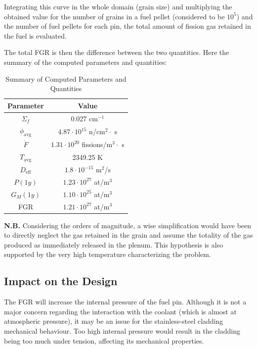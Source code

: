 Integrating this curve in the whole domain (grain size) and multiplying the obtained value for the number of grains in a fuel pellet (considered to be $10^5$) and the number of fuel pellets for each pin, the total amount of fission gas retained in the fuel is evaluated.

The total FGR is then the difference between the two quantities. Here the summary of the computed parameters and quantities:

\begin{table}[h!]
    \centering
    \caption{Summary of Computed Parameters and Quantities}
    \begin{tabular}{|c|c|}
        \hline
        \textbf{Parameter} & \textbf{Value} \\
        \hline
        $\Sigma_f$ & 0.027 cm$^{-1}$ \\
        $\phi_{\text{avg}}$ & $4.87 \cdot 10^{15}$ n/cm$^2 \cdot$ s \\
        $\dot{F}$ & $1.31 \cdot 10^{20}$ fissions/m$^3 \cdot$ s \\
        $T_{\text{avg}}$ & 2349.25 K \\
        $D_{\text{eff}}$ & $1.8 \cdot 10^{-15}$ m$^2$/s \\
        $P(1y)$ & $1.23 \cdot 10^{27}$ at/m$^3$ \\
        $G_M(1y)$ & $1.10 \cdot 10^{25}$ at/m$^3$ \\
        FGR & $1.21 \cdot 10^{27}$ at/m$^3$ \\
        \hline
    \end{tabular}
    \label{tab:fgr_summary}
\end{table}

\noindent \textbf{N.B.} Considering the orders of magnitude, a wise simplification would have been to directly neglect the gas retained in the grain and assume the totality of the gas produced as immediately released in the plenum. This hypothesis is also supported by the very high temperature characterizing the problem.

\subsection{Impact on the Design}

The FGR will increase the internal pressure of the fuel pin. Although it is not a major concern regarding the interaction with the coolant (which is almost at atmospheric pressure), it may be an issue for the stainless-steel cladding mechanical behaviour. Too high internal pressure would result in the cladding being too much under tension, affecting its mechanical properties.

